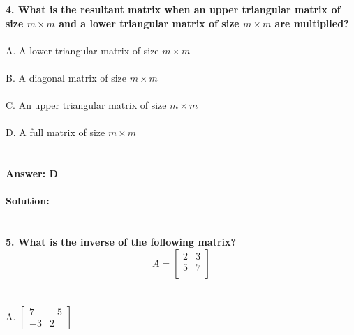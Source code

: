 \documentclass[prl,twocolumn,showpacs,preprintnumbers,superscriptaddress]{revtex4}
\theoremstyle{plain}
\theoremstyle{definition}
\begin{document}
\begin{widetext}
\textbf{4. What is the resultant matrix when an upper triangular matrix of size $m \times m$ and a lower triangular matrix of size $m \times m$ are multiplied?}
\\
\\
A. A lower triangular matrix of size $m \times m$
\\
\\
B. A diagonal matrix of size $m \times m$
\\
\\
C. An upper triangular matrix of size $m \times m$
\\
\\
D. A full matrix of size $m \times m$
\\
\\
\\
\textbf{Answer: D}
\\
\\
\textbf{Solution:} 
\\
\\
\\
\textbf{5. What is the inverse of the following matrix?}
\\
\[ A= 
\begin{bmatrix}    2 & 3 \\     5 & 7 \\ \end{bmatrix}
\]
\\
\\
A. $\begin{bmatrix}   7 & -5 \\ -3 & 2 \end{bmatrix}$\\

\end{widetext}
\end{document}
